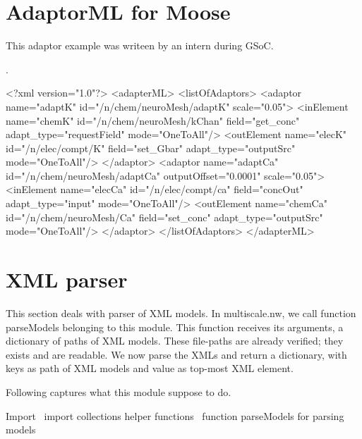 \documentclass[]{article}%
\begin{document}
\eatline
{}\nwendcode{}\nwdocspar
\section{AdaptorML for Moose}
\label{sec:adaptor}
  
  This adaptor example was writeen by an intern during GSoC. 

 .

\nwenddocs{}\endmoddef\nwstartdeflinemarkup\nwenddeflinemarkup
<?xml version="1.0"?>
  <adapterML>
    <listOfAdaptors>
    <adaptor name="adaptK" id="/n/chem/neuroMesh/adaptK" scale="0.05">
      <inElement name="chemK" id="/n/chem/neuroMesh/kChan" field="get_conc" 
            adapt_type="requestField" mode="OneToAll"/>
      <outElement name="elecK" id="/n/elec/compt/K" field="set_Gbar" 
            adapt_type="outputSrc" mode="OneToAll"/>
    </adaptor>
    <adaptor name="adaptCa" id="/n/chem/neuroMesh/adaptCa" outputOffset="0.0001" scale="0.05">
      <inElement name="elecCa" id="/n/elec/compt/ca" field="concOut" 
            adapt_type="input" mode="OneToAll"/>
      <outElement name="chemCa" id="/n/chem/neuroMesh/Ca" field="set_conc" 
            adapt_type="outputSrc" mode="OneToAll"/>
    </adaptor>
  </listOfAdaptors>
</adapterML>
\eatline
{}\nwendcode{}\section{XML parser}
\label{sec:parser}

  This section deals with parser of XML models. In {\Tt{}multiscale.nw\nwendquote}, we call
  function {\Tt{}parseModels\nwendquote} belonging to this module. This function receives its
  arguments, a dictionary of paths of XML models. These file-paths are already
  verified; they exists and are readable. We now parse the XMLs and return a
  dictionary, with keys as path of XML models and value as top-most XML element.

  Following captures what this module suppose to do.

\nwenddocs{}\endmoddef\nwstartdeflinemarkup\nwenddeflinemarkup
\LA{}Import~{\nwtagstyle{}}\RA{}
import collections
\LA{}helper functions~{\nwtagstyle{}}\RA{}
\LA{}function \code{}parseModels\edoc{} for parsing models~{\nwtagstyle{}}\RA{}
\nwendcode{}\nwdocspar
\end{document}
